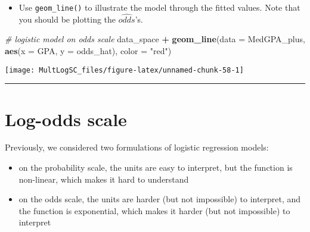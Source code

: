 \documentclass[]{book}
\newenvironment{Shaded}{\begin{snugshade}}{\end{snugshade}}
\newcommand{\KeywordTok}[1]{\textcolor[rgb]{0.13,0.29,0.53}{\textbf{#1}}}
\newcommand{\DataTypeTok}[1]{\textcolor[rgb]{0.13,0.29,0.53}{#1}}
\newcommand{\DecValTok}[1]{\textcolor[rgb]{0.00,0.00,0.81}{#1}}
\newcommand{\StringTok}[1]{\textcolor[rgb]{0.31,0.60,0.02}{#1}}
\newcommand{\CommentTok}[1]{\textcolor[rgb]{0.56,0.35,0.01}{\textit{#1}}}
\newcommand{\OperatorTok}[1]{\textcolor[rgb]{0.81,0.36,0.00}{\textbf{#1}}}
\newcommand{\NormalTok}[1]{#1}
\providecommand{\tightlist}{%
  \setlength{\itemsep}{0pt}\setlength{\parskip}{0pt}}
\begin{document}
\begin{Shaded}
\end{Shaded}

\begin{itemize}
\tightlist
\item
  Use \texttt{geom\_line()} to illustrate the model through the fitted
  values. Note that you should be plotting the \(\hat{odds}\)'s.
\end{itemize}

\begin{Shaded}
\begin{Highlighting}[]
\CommentTok{# logistic model on odds scale}
\NormalTok{data_space }\OperatorTok{+}
\StringTok{  }\KeywordTok{geom_line}\NormalTok{(}\DataTypeTok{data =}\NormalTok{ MedGPA_plus, }\KeywordTok{aes}\NormalTok{(}\DataTypeTok{x =}\NormalTok{ GPA, }\DataTypeTok{y =}\NormalTok{ odds_hat), }\DataTypeTok{color =} \StringTok{"red"}\NormalTok{)}
\end{Highlighting}
\end{Shaded}

\begin{center}\texttt{[image: MultLogSC\_files/figure-latex/unnamed-chunk-58-1]} \end{center}

\begin{center}\rule{0.5\linewidth}{\linethickness}\end{center}

\section{Log-odds scale}\label{log-odds-scale}

Previously, we considered two formulations of logistic regression
models:

\begin{itemize}
\item
  on the probability scale, the units are easy to interpret, but the
  function is non-linear, which makes it hard to understand
\item
  on the odds scale, the units are harder (but not impossible) to
  interpret, and the function is exponential, which makes it harder (but
  not impossible) to interpret
\end{itemize}
\end{document}
